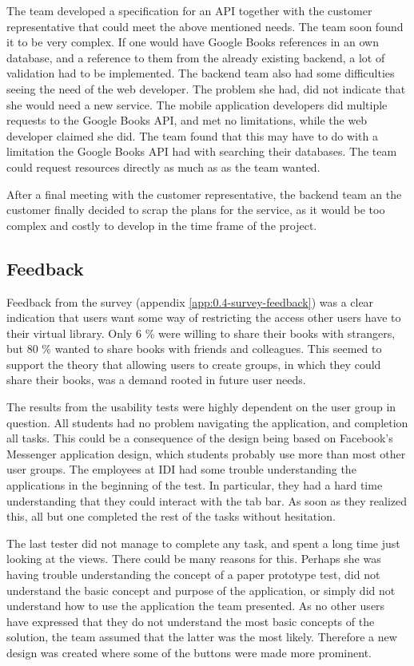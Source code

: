 The team developed a specification for an \gls{API} together with the customer representative that could meet the above mentioned needs. The team soon found it to be very complex. If one would have Google Books references in an own database, and a reference to them from the already existing \gls{backend}, a lot of validation had to be implemented. The backend team also had some difficulties seeing the need of the web developer. The problem she had, did not indicate that she would need a new service. The mobile application developers did multiple requests to the Google Books API, and met no limitations, while the web developer claimed she did. The team found that this may have to do with a limitation the Google Books \gls{API} had with searching their databases. The team could request resources directly as much as as the team wanted.

After a final meeting with the customer representative, the \gls{backend} team an the customer finally decided to scrap the plans for the service, as it would be too complex and costly to develop in the time frame of the project. 

\subsection{Feedback}
Feedback from the survey (appendix \ref{app:0.4-survey-feedback}) was a clear indication that users want some way of restricting the access other users have to their virtual library. Only 6 \% were willing to share their books with strangers, but 80 \% wanted to share books with friends and colleagues. This seemed to support the theory that allowing users to create groups, in which they could share their books, was a demand rooted in future user needs.


The results from the usability tests were highly dependent on the user group in question. All students had no problem navigating the application, and completion all tasks. This could be a consequence of the design being based on Facebook's Messenger application design, which  students probably use more than most other user groups. The employees at \gls{IDI} had some trouble understanding the applications in the beginning of the test. In particular, they had a hard time understanding that they could interact with the tab bar. As soon as they realized this, all but one completed the rest of the tasks without hesitation. 


The last tester did not manage to complete any task, and spent a long time just looking at the views. There could be many reasons for this. Perhaps she was having trouble understanding the concept of a paper prototype test, did not understand the basic concept and purpose of the application, or simply did not understand how to use the application the team presented. As no other users have expressed that they do not understand the most basic concepts of the solution, the team assumed that the latter was the most likely. Therefore a new design was created where some of the buttons were made more prominent. 


